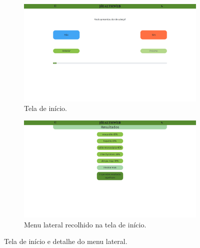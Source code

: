 \begin{figure}[htbp]
	\centering
	\begin{subfigure}{0.49\linewidth}
		\centering
		\includegraphics[width=\linewidth]{figure/disease_real.png}
		\caption{Tela de início.}
		\label{fig:desktop:disease_real}
	\end{subfigure}
	\hfill
	\begin{subfigure}{0.49\linewidth}
		\centering
		\includegraphics[width=\linewidth]{figure/results_real.png}
		\caption{Menu lateral recolhido na tela de início.}
		\label{fig:desktop:results_real}
	\end{subfigure}
	\caption{Tela de início e detalhe do menu lateral.}
	\label{fig:desktop:final}
\end{figure}




